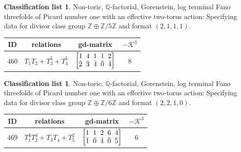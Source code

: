 \documentclass[pdftex]{sigma}%
\theoremstyle{definition}
\newtheorem{class-list}[thm]{Classification list}
\def\ZZ{{\mathbb Z}}
\def\QQ{{\mathbb Q}}
\numberwithin{equation}{section}
\begin{document}
\begin{class-list}
Non-toric, $\QQ$-factorial, Gorenstein, log terminal Fano
threefolds of Picard number one with an effective two-torus action:
Specifying data for divisor class group $\ZZ\oplus \ZZ/5\ZZ$ and
format $(2,1,1,1)$.
\begin{table}[h!]\centering\setlength{\tabcolsep}{5.5pt}
\renewcommand{\arraystretch}{1.1}\small\tabulinesep=1mm
\begin{tabu}{c|c|c|c}
\hline
ID&relations&gd-matrix&$-\mathcal{K}^3$
\\
\hline
${460}$&${T_{1}T_{2}+T_{3}^{5}+T_{4}^{5}}$
&$\arraycolsep=1mm\begin{bmatrix}{1} & {4} & {1} & {1} & {2} \\ {\bar{2}} & {\bar{3}} & {\bar{4}} & {\bar{0}} & {\bar{4}}\end{bmatrix}$&${8}$
\\
\hline
\end{tabu}\vspace{-2mm}
\end{table}
\end{class-list}


\begin{class-list}\label{class-list(0,6)}
Non-toric, $\QQ$-factorial, Gorenstein, log terminal Fano
threefolds of Picard number one with an effective two-torus action:
Specifying data for divisor class group $\ZZ\oplus \ZZ/6\ZZ$ and
format $(2,2,1,0)$.
\begin{table}[h!]\centering\setlength{\tabcolsep}{5.5pt}
\renewcommand{\arraystretch}{1.1}\small\tabulinesep=1mm
\begin{tabu}{c|c|c|c}
\hline
ID&relations&gd-matrix&$-\mathcal{K}^3$
\\
\hline
${469}$&${T_{1}^{4}T_{2}^{4}+T_{3}T_{4}+T_{5}^{2}}$
&$\arraycolsep=1mm\begin{bmatrix}{1} & {1} & {2} & {6} & {4} \\ {\bar{1}} & {\bar{0}} & {\bar{4}} & {\bar{0}} & {\bar{5}}\end{bmatrix}$&${6}$
\\
\hline
\end{tabu}\vspace{-2mm}
\end{table}
\end{class-list}
\end{document}
